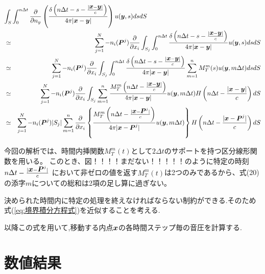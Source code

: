 \documentclass[dvipdfmx]{ampbt}
\def\vector#1{\mbox{\boldmath $#1$}}
\begin{document}
\begin{eqnarray}
\lefteqn{\int_{S} \int_{0}^{n \Delta t} \frac{\partial }{\partial n_{y}} \left( \frac{\delta \left(n \Delta t -s - \frac{|\vector{x}-\vector{y}|}{c}\right)}{4 \pi |\vector{x} - \vector{y}|} \right) u(\vector{y},s) ds dS }  \nonumber \\
& \simeq & \sum^{N}_{j=1} -n_{i}(\vector{P}^{j}) \frac{\partial }{\partial x_i} \int_{S_j}
 \int_{0}^{n \Delta t} \frac{\delta \left(n \Delta t -s - \frac{|\vector{x}-\vector{y}|}{c}\right)}{4 \pi |\vector{x} - \vector{y}|} u(\vector{y},s) ds dS \nonumber \\
& \simeq & \sum^{N}_{j=1} -n_{i}(\vector{P}^{j}) \frac{\partial }{\partial x_i} \int_{S_j}
  \int_{0}^{n \Delta t} \frac{\delta \left(n \Delta t -s - \frac{|\vector{x}-\vector{y}|}{c}\right)}{4 \pi |\vector{x} - \vector{y}|} \sum^{n}_{m=1} M_{T}^{m}(s) u(\vector{y},m \Delta t) ds dS \nonumber \\
& \simeq & \sum^{N}_{j=1} -n_{i}(\vector{P}^{j}) \frac{\partial }{\partial x_i} \int_{S_j}
    \sum^{n}_{m=1} \frac{M_{T}^{m} \left(n \Delta t - \frac{|\vector{x}-\vector{y}|}{c}\right)}{4 \pi |\vector{x} - \vector{y}|}  u(\vector{y},m \Delta t) H \left( n \Delta t - \frac{|\vector{x}-\vector{y}|}{c} \right) dS \nonumber \\
& \simeq & \sum^{N}_{j=1} -n_{i}(\vector{P}^{j}) |S_j| \sum^{n}_{m=1} \frac{\partial }{\partial x_i}
\left\{ \frac{M_{T}^{m} \left(n \Delta t - \frac{|\vector{x}-\vector{P}^{j}|}{c}\right)}
    {4 \pi |\vector{x} - \vector{P}^{j}|}  u(\vector{y},m \Delta t) \right\} H \left( n \Delta t - \frac{|\vector{x}-\vector{P}^{j}|}{c} \right) dS \nonumber
\end{eqnarray}

今回の解析では、時間内挿関数$M_T^{m}(t)$として$2 \Delta t$のサポートを持つ区分線形関数を用いる。
このとき、図！！！！まだない！！！！！のように特定の時刻$n \Delta t - \frac{|\vector{x}-\vector{P}^{j}|}{c}$
において非ゼロの値を返す$M_{T}^{m}(t)$は2つのみであるから、式(20)の添字$m$についての総和は2項の足し算に過ぎない。



決められた時間内に特定の処理を終えなければならない制約ができる.そのため式(\ref{eq:境界積分方程式})を近似することを考える.\par
以降この式を用いて,移動する内点$\vector{x}$の各時間ステップ毎の音圧を計算する.



\section{数値結果}
\end{document}
